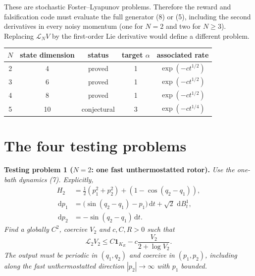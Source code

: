 \documentclass[11pt]{article}
\newcommand{\1}{\mathbf{1}}
\newcommand{\cL}{\mathcal{L}}
\newcommand{\dd}{\,\mathrm{d}}
\begin{document}
These are stochastic Foster--Lyapunov problems. Therefore the reward and falsification code must evaluate the full generator (8) or (5), including the second derivatives in every noisy momentum (one for $N=2$ and two for $N\ge3$). Replacing $\cL_NV$ by the first-order Lie derivative would define a different problem.

\begin{center}
\begin{tabular}{ccccc}
\toprule
$N$ & state dimension & status & target $\alpha$ & associated rate\\
\midrule
2 & 4  & proved      & 1 & $\exp(-ct^{1/2})$\\
3 & 6  & proved      & 1 & $\exp(-ct^{1/2})$\\
4 & 8  & proved      & 1 & $\exp(-ct^{1/2})$\\
5 & 10 & conjectural & 3 & $\exp(-ct^{1/4})$\\
\bottomrule
\end{tabular}
\end{center}

\section{The four testing problems}

\noindent\textbf{Testing problem 1 ($N=2$: one fast unthermostatted rotor).}
\emph{Use the one-bath dynamics (7). Explicitly,}
\begin{align*}
H_2&=\frac12(p_1^2+p_2^2)+(1-\cos(q_2-q_1)),\\
\dd p_1&=\bigl(\sin(q_2-q_1)-p_1\bigr)\dd t+\sqrt2\,\dd B_t^1,\\
\dd p_2&=-\sin(q_2-q_1)\dd t.
\end{align*}
\emph{Find a globally $C^2$, coercive $V_2$ and $c,C,R>0$ such that}
\begin{equation}
\cL_2V_2\le C\1_{K_R}-c\frac{V_2}{2+\log V_2}.
\end{equation}
\emph{The output must be periodic in $(q_1,q_2)$ and coercive in $(p_1,p_2)$, including along the fast unthermostatted direction $|p_2|\to\infty$ with $p_1$ bounded.}
\end{document}
